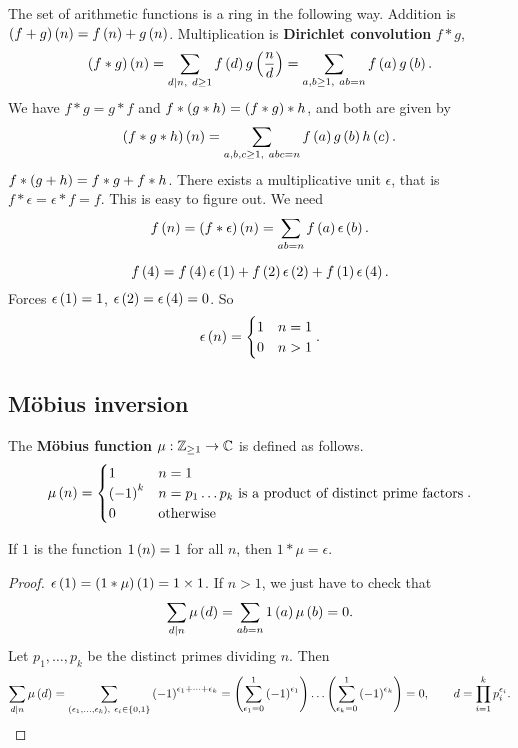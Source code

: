 The set of arithmetic functions is a ring in the following way. Addition is $ \left( f + g \right)\left( n \right) = f\left( n \right) + g\left( n \right) $. Multiplication is \textbf{Dirichlet convolution} $ f * g $,
$$ \left( f * g \right)\left( n \right) = \sum_{d \mid n, \ d \ge 1} f\left( d \right)g\left( \dfrac{n}{d} \right) = \sum_{a, b \ge 1, \ ab = n} f\left( a \right)g\left( b \right). $$
We have $ f * g = g * f $ and $ f * \left( g * h \right) = \left( f * g \right) * h $, and both are given by
$$ \left( f * g * h \right)\left( n \right) = \sum_{a, b, c \ge 1, \ abc = n} f\left( a \right)g\left( b \right)h\left( c \right). $$
$ f * \left( g + h \right) = f * g + f * h $. There exists a multiplicative unit $ \epsilon $, that is $ f * \epsilon = \epsilon * f = f $. This is easy to figure out. We need
$$ f\left( n \right) = \left( f * \epsilon \right)\left( n \right) = \sum_{ab = n} f\left( a \right)\epsilon\left( b \right). $$

\begin{example*}
$$ f\left( 4 \right) = f\left( 4 \right)\epsilon\left( 1 \right) + f\left( 2 \right)\epsilon\left( 2 \right) + f\left( 1 \right)\epsilon\left( 4 \right). $$
Forces $ \epsilon\left( 1 \right) = 1 $, $ \epsilon\left( 2 \right) = \epsilon\left( 4 \right) = 0 $. So
$$ \epsilon\left( n \right) =
\begin{cases}
1 & n = 1 \\
0 & n > 1
\end{cases}.
$$
\end{example*}

\subsection{M\"obius inversion}

The \textbf{M\"obius function} $ \mu : \mathbb{Z}_{\ge 1} \to \mathbb{C} $ is defined as follows.
$$ \mu\left( n \right) =
\begin{cases}
1 & n = 1 \\
\left( -1 \right)^k & n = p_1 \dots p_k \ \text{is a product of distinct prime factors} \\
0 & \text{otherwise}
\end{cases}.
$$

\begin{lemma}
\label{lem:103}
If $ 1 $ is the function $ 1\left( n \right) = 1 $ for all $ n $, then $ 1 * \mu = \epsilon $.
\end{lemma}

\begin{proof}
$ \epsilon\left( 1 \right) = \left( 1 * \mu \right)\left( 1 \right) = 1 \times 1 $. If $ n > 1 $, we just have to check that
$$ \sum_{d \mid n} \mu\left( d \right) = \sum_{ab = n} 1\left( a \right)\mu\left( b \right) = 0. $$
Let $ p_1, \dots, p_k $ be the distinct primes dividing $ n $. Then
$$ \sum_{d \mid n} \mu\left( d \right) = \sum_{\left( \epsilon_1, \dots, \epsilon_k \right), \ \epsilon_i \in \left\{ 0, 1 \right\}} \left( -1 \right)^{\epsilon_1 + \dots + \epsilon_k} = \left( \sum_{\epsilon_1 = 0}^1 \left( -1 \right)^{\epsilon_1} \right) \dots \left( \sum_{\epsilon_k = 0}^1 \left( -1 \right)^{\epsilon_k} \right) = 0, \qquad d = \prod_{i = 1}^k p_i^{\epsilon_i}. $$
\end{proof}

